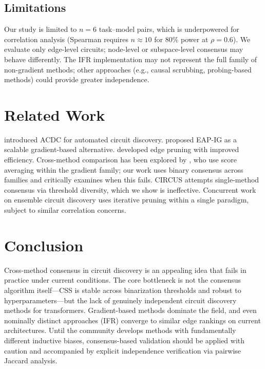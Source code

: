 \documentclass[11pt]{article}
\begin{document}
\subsection{Limitations}

Our study is limited to $n=6$ task--model pairs, which is underpowered for correlation analysis (Spearman requires $n \approx 10$ for 80\% power at $\rho = 0.6$). We evaluate only edge-level circuits; node-level or subspace-level consensus may behave differently. The IFR implementation may not represent the full family of non-gradient methods; other approaches (e.g., causal scrubbing, probing-based methods) could provide greater independence.

\section{Related Work}

\citet{conmy2023towards} introduced ACDC for automated circuit discovery. \citet{syed2023attribution} proposed EAP-IG as a scalable gradient-based alternative. \citet{li2024edge} developed edge pruning with improved efficiency. Cross-method comparison has been explored by \citet{mondorf2025cross}, who use score averaging within the gradient family; our work uses binary consensus across families and critically examines when this fails. CIRCUS \citep{parekh2026circus} attempts single-method consensus via threshold diversity, which we show is ineffective. Concurrent work on ensemble circuit discovery \citep{pie2026} uses iterative pruning within a single paradigm, subject to similar correlation concerns.

\section{Conclusion}

Cross-method consensus in circuit discovery is an appealing idea that fails in practice under current conditions. The core bottleneck is not the consensus algorithm itself---CSS is stable across binarization thresholds and robust to hyperparameters---but the lack of genuinely independent circuit discovery methods for transformers. Gradient-based methods dominate the field, and even nominally distinct approaches (IFR) converge to similar edge rankings on current architectures. Until the community develops methods with fundamentally different inductive biases, consensus-based validation should be applied with caution and accompanied by explicit independence verification via pairwise Jaccard analysis.



\end{document}
